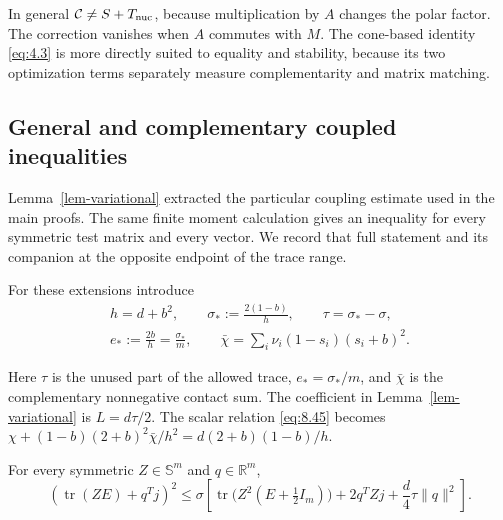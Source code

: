 In general $\mathcal C\ne S+T_{\rm nuc}$, because multiplication by $A$ changes the polar factor. The correction vanishes when $A$ commutes with $M$. The cone-based identity \eqref{eq:4.3} is more directly suited to equality and stability, because its two optimization terms separately measure complementarity and matrix matching.

\subsection{General and complementary coupled inequalities}\label{sec:10.4}

Lemma~\ref{lem-variational} extracted the particular coupling estimate used in the main proofs.
The same finite moment calculation gives an inequality for every symmetric
test matrix and every vector. We record that full statement and its companion
at the opposite endpoint of the trace range.

For these extensions introduce
\begin{equation}\label{eq:10.9}
\begin{gathered}
h=d+b^2,\qquad\sigma_*:=\frac{2(1-b)}h,\qquad\tau=\sigma_*-\sigma,\\
e_*:=\frac{2b}h=\frac{\sigma_*}{m},\qquad
\bar\chi=\sum_i\nu_i(1-s_i)(s_i+b)^2.
\end{gathered}
\end{equation}

Here $\tau$ is the unused part of the allowed trace, $e_*=\sigma_*/m$,
and $\bar\chi$ is the complementary nonnegative contact sum.
The coefficient in Lemma~\ref{lem-variational} is $L=d\tau/2$.
The scalar relation \eqref{eq:8.45} becomes
$\chi+(1-b)(2+b)^2\bar\chi/h^2=d(2+b)(1-b)/h$.

\begin{lemma}\label{lem-cauchy}
For every symmetric $Z\in\mathbb S^m$ and $q\in\mathbb R^m$,
\begin{equation}\label{eq:10.10}
(\operatorname{tr}(ZE)+q^Tj)^2
\le\sigma\left[
\operatorname{tr}\bigl(Z^2(E+\tfrac12I_m)\bigr)
+2q^TZj+\frac d4\tau\|q\|^2\right].
\end{equation}

\end{lemma}

